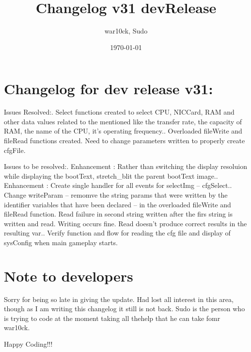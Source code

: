 \documentclass[a4paper]{article}
\begin{document}
\title{Changelog v31 devRelease}	%
\author{war10ck, Sudo}	%
\date{\today}
\maketitle

\section{Changelog for dev release v31:}
Issues Resolved:. Select functions created to select CPU, NICCard, RAM and other data values related to the mentioned like the transfer rate, the capacity of RAM, the name of the CPU, it's operating frequency.. Overloaded fileWrite and fileRead functions created. Need to change parameters written to properly create cfgFile.\newline

Issues to be resolved:. Enhancement : Rather than switching the display resoluion while displaying the bootText, stretch\_blit the parent bootText image.. Enhancement : Create single handler for all events for selectImg -- cfgSelect.. Change writeParam -- remomve the string params that were written by the identifier variables that have been declared -- in the overloaded fileWrite and fileRead function. Read failure in second string written after the firs string is written and read. Writing occurs fine. Read doesn't produce correct results in the resulting var.. Verify function and flow for reading the cfg file and display of sysConfig when main gameplay starts.\newline

\section{Note to developers}
Sorry for being so late in giving the update. Had lost all interest in this area, though as I am writing this changelog it still is not back. Sudo is the person who is trying to code at the moment taking all thehelp that he can take fomr war10ck.\newline

Happy Coding!!!\newline

\pagebreak
\end{document}
